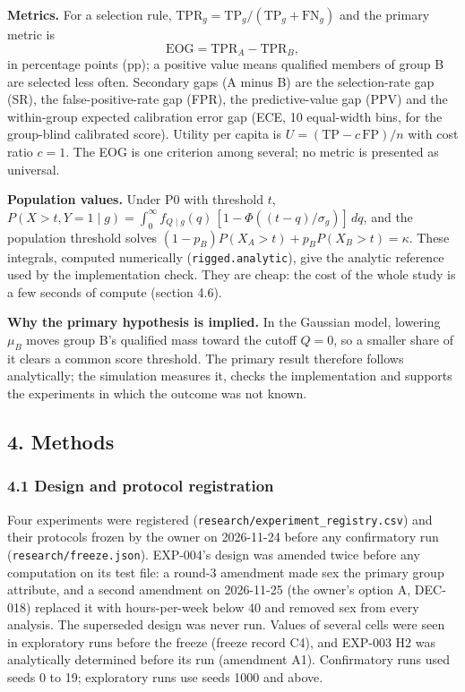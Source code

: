\documentclass[
]{article}
\begin{document}
\textbf{Metrics.} For a selection rule,
\(\mathrm{TPR}_g = \mathrm{TP}_g / (\mathrm{TP}_g + \mathrm{FN}_g)\) and
the primary metric is
\[\mathrm{EOG} = \mathrm{TPR}_A - \mathrm{TPR}_B,\] in percentage points
(pp); a positive value means qualified members of group B are selected
less often. Secondary gaps (A minus B) are the selection-rate gap (SR),
the false-positive-rate gap (FPR), the predictive-value gap (PPV) and
the within-group expected calibration error gap (ECE, 10 equal-width
bins, for the group-blind calibrated score). Utility per capita is
\(U = (\mathrm{TP} - c\,\mathrm{FP})/n\) with cost ratio \(c = 1\). The
EOG is one criterion among several; no metric is presented as universal.

\textbf{Population values.} Under P0 with threshold \(t\),
\(P(X > t, Y = 1 \mid g) = \int_{0}^{\infty} f_{Q \mid g}(q)\,[1 - \Phi((t - q)/\sigma_g)]\,dq\),
and the population threshold solves
\((1 - p_B) P(X_A > t) + p_B P(X_B > t) = \kappa\). These integrals,
computed numerically (\texttt{rigged.analytic}), give the analytic
reference used by the implementation check. They are cheap: the cost of
the whole study is a few seconds of compute (section 4.6).

\textbf{Why the primary hypothesis is implied.} In the Gaussian model,
lowering \(\mu_B\) moves group B's qualified mass toward the cutoff
\(Q = 0\), so a smaller share of it clears a common score threshold. The
primary result therefore follows analytically; the simulation measures
it, checks the implementation and supports the experiments in which the
outcome was not known.

\subsection{4. Methods}\label{methods}

\subsubsection{4.1 Design and protocol
registration}\label{design-and-protocol-registration}

Four experiments were registered
(\texttt{research/experiment\_registry.csv}) and their protocols frozen
by the owner on 2026-11-24 before any confirmatory run
(\texttt{research/freeze.json}). EXP-004's design was amended twice
before any computation on its test file: a round-3 amendment made sex
the primary group attribute, and a second amendment on 2026-11-25 (the
owner's option A, DEC-018) replaced it with hours-per-week below 40 and
removed sex from every analysis. The superseded design was never run.
Values of several cells were seen in exploratory runs before the freeze
(freeze record C4), and EXP-003 H2 was analytically determined before
its run (amendment A1). Confirmatory runs used seeds 0 to 19;
exploratory runs use seeds 1000 and above.
\end{document}
